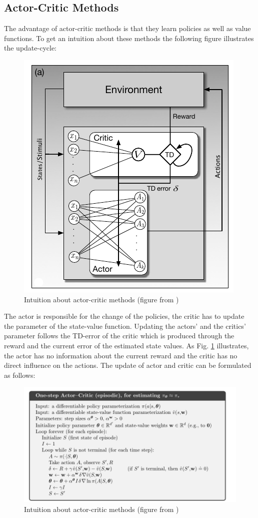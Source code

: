 \subsection{Actor-Critic Methods}
\label{sec:actor-critic}
The advantage of actor-critic methods is that they learn policies as well as 
value functions. To get an intuition about these methods the following figure 
illustrates the update-cycle:
\begin{figure}[H]
	\centering
	\includegraphics[width=0.4\linewidth]{actor-critic}
	\caption{Intuition about actor-critic methods (figure from 
	\cite{sutton2018reinforcement})}
	\label{fig:actor-critic}
\end{figure}
The actor is responsible for the change of the policies, the critic has to 
update the parameter of the state-value function. Updating the actors' and the 
critics' parameter follows the TD-error of the critic which is produced through 
the reward and the current error of the estimated state values. As Fig. 
\ref{fig:actor-critic} illustrates, the actor has no information about the 
current reward and the critic has no direct influence on the actions.  
The update of actor and critic can be formulated as follows:
\begin{figure}[H]
	\centering
	\includegraphics[width=0.6\linewidth]{actor-critic-algo}
	\caption{Intuition about actor-critic methods (figure from 
		\cite{sutton2018reinforcement})}
	\label{fig:actor-critic-algo}
\end{figure}

